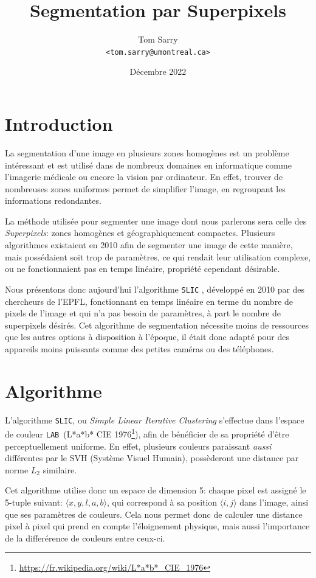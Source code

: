 \documentclass[12pt]{article}
\title{\vspace{-1cm} Segmentation par Superpixels}
\author{
  Tom Sarry \\
  \texttt{<tom.sarry@umontreal.ca>}
}
\date{D\'ecembre 2022}
\newcommand{\lab}{\texttt{LAB}}
\begin{document}
\maketitle

\section{Introduction}

La segmentation d'une image en plusieurs zones homog\`enes est un probl\`eme int\'eressant
et est utilis\'e dans de nombreux domaines en informatique comme l'imagerie m\'edicale ou encore la vision par ordinateur.
En effet, trouver de nombreuses zones uniformes permet de simplifier l'image, en regroupant les informations redondantes.

La m\'ethode utilis\'ee pour segmenter une image dont nous parlerons sera celle des \textit{Superpixels}:
zones homog\`enes et g\'eographiquement compactes.
Plusieurs algorithmes existaient en 2010 afin de segmenter une image de cette mani\`ere, mais poss\'edaient soit
trop de param\`etres, ce qui rendait leur utilisation complexe, ou ne fonctionnaient pas en temps lin\'eaire, propri\'et\'e cependant d\'esirable.

Nous pr\'esentons donc aujourd'hui l'algorithme \texttt{SLIC} \cite*{slic}, d\'evelopp\'e en 2010 par des chercheurs de l'EPFL,
fonctionnant en temps lin\'eaire en terme du nombre de pixels de l'image
et qui n'a pas besoin de param\`etres, \`a part le nombre de superpixels d\'esir\'es.
Cet algorithme de segmentation n\'ecessite moins de ressources que les autres options \`a disposition \`a l'\'epoque,
il \'etait donc adapt\'e pour des appareils moins puissants comme des petites cam\'eras ou des t\'el\'ephones.

\section{Algorithme}

L'algorithme \texttt{SLIC}, ou \textit{Simple Linear Iterative Clustering} s'effectue dans l'espace
de couleur \lab\ (L*a*b* CIE 1976\footnote{\url{https://fr.wikipedia.org/wiki/L*a*b*_CIE_1976}}),
afin de b\'en\'eficier de sa propri\'et\'e d'\^etre perceptuellement uniforme.
En effet, plusieurs couleurs paraissant \textit{aussi} diff\'erentes par le SVH (Syst\`eme Visuel Humain),
poss\`ederont une distance par norme $L_2$ similaire.

Cet algorithme utilise donc un espace de dimension 5: chaque pixel est assign\'e le 5-tuple suivant: $\langle x, y, l, a, b \rangle$,
qui correspond \`a sa position $\langle i, j\rangle$ dans l'image, ainsi que ses param\`etres de couleurs.
Cela nous permet donc de calculer une distance pixel \`a pixel qui prend en compte l'\'eloignement physique,
mais aussi l'importance de la differ\'erence de couleurs entre ceux-ci.
\end{document}
